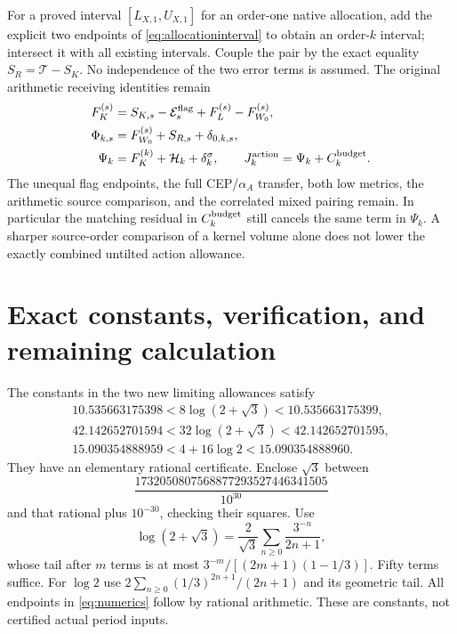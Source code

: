 \documentclass[11pt,a4paper]{article}
\begin{document}
For a proved interval $[L_{X,1},U_{X,1}]$ for an order-one native allocation, add the explicit two endpoints of \eqref{eq:allocationinterval} to obtain an order-$k$ interval; intersect it with all existing intervals. Couple the pair by the exact equality $S_R=\mathcal T-S_K$. No independence of the two error terms is assumed. The original arithmetic receiving identities remain
\begin{equation}
\begin{split}
 F_K^{(s)}&=S_{K,s}-\mathcal E_s^{\rm flag}+F_L^{(s)}-F_{W_0}^{(s)},\\
 \Phi_{k,s}&=F_{W_0}^{(s)}+S_{R,s}+\delta_{0,k,s},\\
 \Psi_k&=F_K^{(k)}+\mathcal H_k+\delta_k^\sigma,
 \qquad J_k^{\rm action}=\Psi_k+C_k^{\rm budget}.
\end{split}\label{eq:return}
\end{equation}
The unequal flag endpoints, the full CEP/$\alpha_A$ transfer, both low metrics, the arithmetic source comparison, and the correlated mixed pairing remain. In particular the matching residual in $C_k^{\rm budget}$ still cancels the same term in $\Psi_k$. A sharper source-order comparison of a kernel volume alone does not lower the exactly combined untilted action allowance.

\section{Exact constants, verification, and remaining calculation}
The constants in the two new limiting allowances satisfy
\begin{equation}
\begin{gathered}
 10.535663175398<8\log(2+\sqrt3)<10.535663175399,\\
 42.142652701594<32\log(2+\sqrt3)<42.142652701595,\\
 15.090354888959<4+16\log2<15.090354888960.
\end{gathered}\label{eq:numerics}
\end{equation}
They have an elementary rational certificate. Enclose $\sqrt3$ between
\[\frac{1732050807568877293527446341505}{10^{30}}\] and that rational plus $10^{-30}$, checking their squares. Use
\[
 \log(2+\sqrt3)=\frac2{\sqrt3}\sum_{n\ge0}\frac{3^{-n}}{2n+1},
\]
whose tail after $m$ terms is at most $3^{-m}/[(2m+1)(1-1/3)]$. Fifty terms suffice. For $\log2$ use $2\sum_{n\ge0}(1/3)^{2n+1}/(2n+1)$ and its geometric tail. All endpoints in \eqref{eq:numerics} follow by rational arithmetic. These are constants, not certified actual period inputs.
\end{document}
